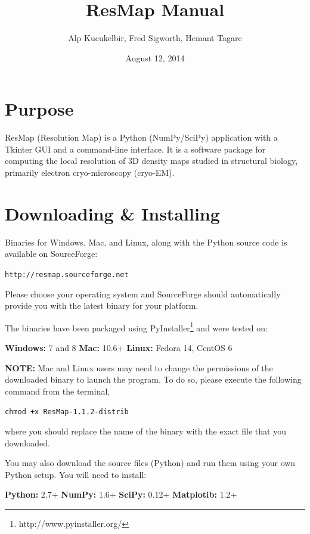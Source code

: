 \documentclass[10pt]{article}
\title{\textbf{ResMap Manual}\break {\normalsize\texttt{[version 1.1.5]}}}
\author{Alp Kucukelbir, Fred Sigworth, Hemant Tagare}
\date{August 12, 2014}
\begin{document}
\maketitle

\tableofcontents

\section{Purpose}
ResMap (Resolution Map) is a Python (NumPy/SciPy) application with a Tkinter GUI and a command-line interface. It is a software package for computing the local resolution of 3D density maps studied in structural biology, primarily electron cryo-microscopy (cryo-EM).

\newpage

\section{Downloading \& Installing}
\label{downloadAndInstall}
Binaries for Windows, Mac, and Linux, along with the Python source code is available on SourceForge:
\begin{center}
	\textcolor{NavyBlue}{\texttt{http://resmap.sourceforge.net}}
\end{center}

Please choose your operating system and SourceForge should automatically provide you with the latest binary for your platform.

The binaries have been packaged using PyInstaller\footnote{http://www.pyinstaller.org/} and were tested on:
\begin{center}
	\textbf{Windows:} 7 and 8 \quad	\textbf{Mac:} 10.6+ \quad \textbf{Linux:} Fedora 14, CentOS 6
\end{center}

\textcolor{RedOrange}{\textbf{NOTE:}} Mac and Linux users may need to change the permissions of the downloaded binary to launch the program. To do so, please execute the following command from the terminal,
\begin{center}
	\textcolor{NavyBlue}{\texttt{chmod +x ResMap-1.1.2-distrib}}
\end{center}
where you should replace the name of the binary with the exact file that you downloaded.

You may also download the source files (Python) and run them using your own Python setup. You will need to install:
\begin{center}
	\textbf{Python:} 2.7+ \quad	\textbf{NumPy:} 1.6+ \quad \textbf{SciPy:} 0.12+ \quad \textbf{Matplotib:} 1.2+
\end{center}
\end{document}
